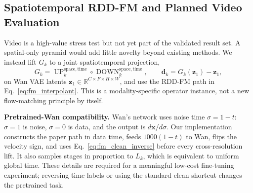 \documentclass[10pt]{article}
\DeclareMathOperator{\DOWN}{DOWN}
\DeclareMathOperator{\UP}{UP}
\newcommand{\R}{\mathbb{R}}
\newcommand{\bx}{\bm{x}}
\newcommand{\bd}{\bm{d}}
\newcommand{\bz}{\bm{z}}
\begin{document}
\subsection{Spatiotemporal RDD-FM and Planned Video Evaluation}
\label{sec:video_results}

Video is a high-value stress test but not yet part of the validated result set. A spatial-only pyramid would add little novelty beyond existing methods. We instead lift $G_k$ to a joint spatiotemporal projection,
\begin{equation}
    G_k=\UP^{\mathrm{space,time}}_k\circ\DOWN^{\mathrm{space,time}}_k,
    \qquad \bd_k=G_k(\bz_1)-\bz_1,
\end{equation}
on Wan VAE latents $\bz_1\in\R^{C\times F\times H\times W}$, and use the RDD-FM path in Eq.~\eqref{eq:fm_interpolant}. This is a modality-specific operator instance, not a new flow-matching principle by itself.

\textbf{Pretrained-Wan compatibility.}
Wan's network uses noise time $\sigma=1-t$: $\sigma=1$ is noise, $\sigma=0$ is data, and the output is $d\bx/d\sigma$. Our implementation constructs the paper path in data time, feeds $1000(1-t)$ to Wan, flips the velocity sign, and uses Eq.~\eqref{eq:fm_clean_inverse} before every cross-resolution lift. It also samples stages in proportion to $L_k$, which is equivalent to uniform global time. These details are required for a meaningful low-cost fine-tuning experiment; reversing time labels or using the standard clean shortcut changes the pretrained task.
\end{document}
